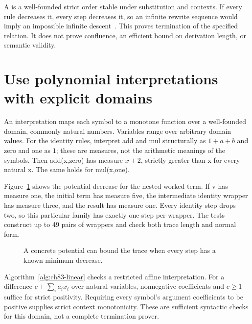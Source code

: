 A  is a well-founded strict order stable under substitution and contexts.
If every rule decreases it, every step decreases it, so an infinite rewrite sequence would imply an impossible infinite descent~\cite{dershowitz-1982-orderings}.
This proves termination of the specified relation.
It does not prove confluence, an efficient bound on derivation length, or semantic validity.

\section{Use polynomial interpretations with explicit domains}
\label{sec:ch83-polynomial}
An interpretation maps each symbol to a monotone function over a well-founded domain, commonly natural numbers.
Variables range over arbitrary domain values.
For the identity rules, interpret add and mul structurally as $1+a+b$ and zero and one as $1$; these are measures, not the arithmetic meanings of the symbols.
Then add(x,zero) has measure $x+2$, strictly greater than x for every natural x.
The same holds for mul(x,one).

Figure~\ref{fig:ch83-potential} shows the potential decrease for the nested worked term.
If v has measure one, the initial term has measure five, the intermediate identity wrapper has measure three, and the result has measure one.
Every identity step drops two, so this particular family has exactly one step per wrapper.
The tests construct up to 49 pairs of wrappers and check both trace length and normal form.

\begin{figure}[htbp]
\centering
{}
\caption{A concrete potential can bound the trace when every step has a known minimum decrease.}
\label{fig:ch83-potential}
\end{figure}

Algorithm~\ref{alg:ch83-linear} checks a restricted affine interpretation.
For a difference $c+\sum_i a_i x_i$ over natural variables, nonnegative coefficients and $c\ge1$ suffice for strict positivity.
Requiring every symbol's argument coefficients to be positive supplies strict context monotonicity.
These are sufficient syntactic checks for this domain, not a complete termination prover.

